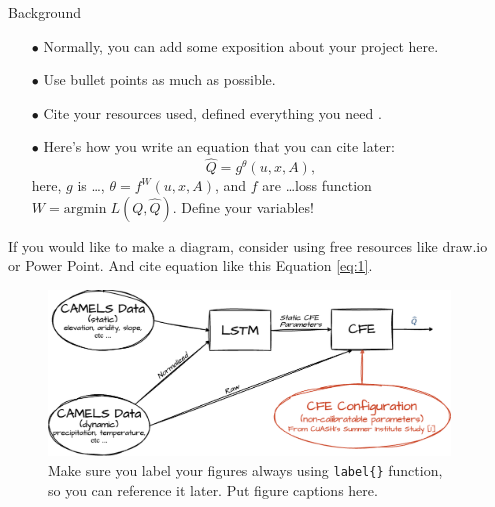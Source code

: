 \documentclass[final]{beamer}
\newlength{\sepwidth}
\newlength{\colwidth}
\newcommand{\separatorcolumn}{\begin{column}{\sepwidth}\end{column}}
\begin{document}
\begin{frame}[t]
\begin{columns}[t]
\separatorcolumn

\begin{column}{\colwidth}

\begin{block}{Background}
\begin{itemize}[topsep=-4pt, partopsep=0pt, parsep=0pt, itemsep=4pt]
	\item[\large\color{blasterBlue}$\bullet$] Normally, you can add some exposition about your project here. 
	\item[\large\color{blasterBlue}$\bullet$] Use bullet points as much as possible. 
	\item[\large\color{blasterBlue}$\bullet$]  Cite your resources used, defined everything you need \cite{PlaceHolderSource}. 
	\item[\large\color{blasterBlue}$\bullet$] Here's how you write an equation that you can cite later:
	\begin{equation}
	\widehat{Q} = g^{\theta}(u, x, A),
	\label{eq:1}
	\end{equation}
	here, $g$ is \dots, $\theta = f^W(u, x, A)$, and $f$ are \dots  loss function $W = \text{argmin} \; L( Q, \widehat{Q})$. Define your variables!
\end{itemize} 

\vspace{0.5in}

If you would like to make a diagram, consider using free resources like \textcolor{redFlannel}{draw.io} or Power Point. And cite equation like this Equation \ref{eq:1}.
\begin{figure}[h]
	\centering
	\includegraphics[width=\linewidth]{Images/NH-dCFEDiagram.png}
	\vspace{0.2in}
	\caption{Make sure you label your figures always using \texttt{label\{\}} function, so you can reference it later. Put figure captions here. }
	\label{fig:NH-dCFEDiagram}
\end{figure} 


\end{block}
\end{column}
\end{columns}
\end{frame}
\end{document}
